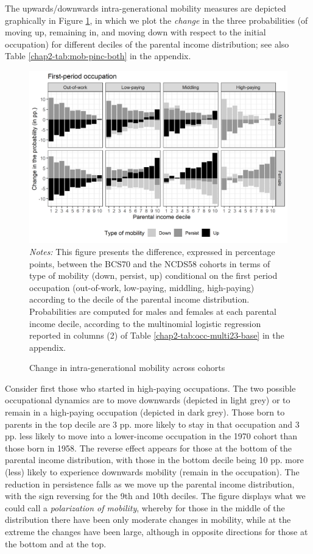 The upwards/downwards intra-generational mobility measures are depicted graphically in Figure \ref{chap2-fig:persist-both}, in which we plot the \emph{change} in the three probabilities (of moving up, remaining in, and moving down with respect to the initial occupation) for different deciles of the parental income distribution; see also Table \ref{chap2-tab:mob-pinc-both} in the appendix.
\begin{figure}[!tb]
    \centering
    \caption{Change in intra-generational mobility across cohorts}
    \label{chap2-fig:persist-both}
    \includegraphics[width=\linewidth]{chap2/graphic/persist-both.png}
    \vspace{-3em}
    \justify\singlespacing\footnotesize{\textit{Notes:} This figure presents the difference, expressed in percentage points, between the BCS70 and the NCDS58 cohorts in terms of type of mobility (down, persist, up) conditional on the first period occupation (out-of-work, low-paying, middling, high-paying) according to the decile of the parental income distribution.
    Probabilities are computed for males and females at each parental income decile, according to the multinomial logistic regression reported in columns (2) of Table \ref{chap2-tab:occ-multi23-base} in the appendix.}
\end{figure}

Consider first those who started in high-paying occupations. The two possible occupational dynamics are to move downwards (depicted in light grey) or to remain in a high-paying occupation (depicted in dark grey). Those born to parents in the top decile are 3 pp. more likely to stay in that occupation and 3 pp. less likely to move into a lower-income occupation in the 1970 cohort than those born in 1958. The reverse effect appears for those at the bottom of the parental income distribution, with those in the bottom decile being 10 pp. more (less) likely to experience downwards mobility (remain in the occupation). The reduction in persistence falls as we move up the parental income distribution, with the sign reversing for the 9th and 10th deciles. The figure displays what we could call a \emph{polarization of mobility}, whereby for those in the middle of the distribution there have been only moderate changes in mobility, while at the extreme the changes have been large, although in opposite directions for those at the bottom and at the top. 

